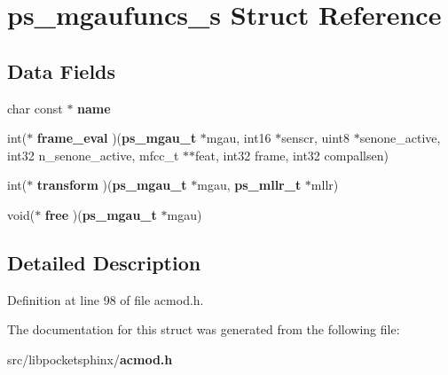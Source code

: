 \section{ps\-\_\-mgaufuncs\-\_\-s Struct Reference}
\label{structps__mgaufuncs__s}
\subsection*{Data Fields}
\begin{DoxyCompactItemize}
\item 
char const $\ast$ {\bfseries name}\label{structps__mgaufuncs__s_a5f3570efd5d8a41003b9628663e66b4c}

\item 
int($\ast$ {\bfseries frame\-\_\-eval} )({\bf ps\-\_\-mgau\-\_\-t} $\ast$mgau, int16 $\ast$senscr, uint8 $\ast$senone\-\_\-active, int32 n\-\_\-senone\-\_\-active, mfcc\-\_\-t $\ast$$\ast$feat, int32 frame, int32 compallsen)\label{structps__mgaufuncs__s_a48d7877641444381ce3eed04749d4d38}

\item 
int($\ast$ {\bfseries transform} )({\bf ps\-\_\-mgau\-\_\-t} $\ast$mgau, {\bf ps\-\_\-mllr\-\_\-t} $\ast$mllr)\label{structps__mgaufuncs__s_aecb9544f91afbff29bf1daa9b6cf32f1}

\item 
void($\ast$ {\bfseries free} )({\bf ps\-\_\-mgau\-\_\-t} $\ast$mgau)\label{structps__mgaufuncs__s_a6b841e50f993e81030471b2982e45be6}

\end{DoxyCompactItemize}


\subsection{Detailed Description}


Definition at line 98 of file acmod.\-h.



The documentation for this struct was generated from the following file\-:\begin{DoxyCompactItemize}
\item 
src/libpocketsphinx/{\bf acmod.\-h}\end{DoxyCompactItemize}
